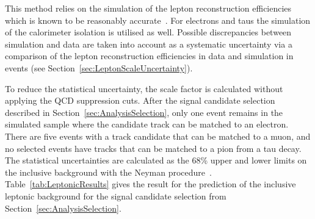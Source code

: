 This method relies on the simulation of the lepton reconstruction efficiencies which is known to be reasonably accurate~\cite{bib:CMS:elec_recoEff,bib:CMS:muon_recoEff,bib:CMS:tau_recoEff}.
For electrons and taus the simulation of the calorimeter isolation is utilised as well.
Possible discrepancies between simulation and data are taken into account as a systematic uncertainty via a comparison of the lepton reconstruction efficiencies in data and simulation in \Zlep events (see Section~\ref{sec:LeptonScaleUncertainty}).

To reduce the statistical uncertainty, the scale factor is calculated without applying the QCD suppression cuts. 
After the signal candidate selection described in Section~\ref{sec:AnalysisSelection}, only one event remains in the simulated \WJets sample where the candidate track can be matched to an electron.
There are five events with a track candidate that can be matched to a muon, and no selected events have tracks that can be matched to a pion from a tau decay.
The statistical uncertainties are calculated as the 68\% upper and lower limits on the inclusive background with the Neyman procedure~\cite{bib:Neyman_1937,bib:PDG_2014}.
Table~\ref{tab:LeptonicResults} gives the result for the prediction of the inclusive leptonic background for the signal candidate selection from Section~\ref{sec:AnalysisSelection}.

\renewcommand{\arraystretch}{1.5}
\begin{table}[!h]
\centering
\caption{Scale factor \leptonscalefactor, number of events in the data control region N$_{\text{CR,data}}$ and the resulting inclusive estimation N$_{\text{predicted}}$ after the candidate track selection.}
\label{tab:LeptonicResults}
\end{table}


